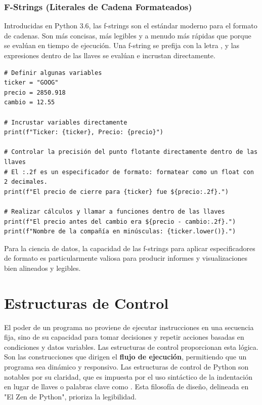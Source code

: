 \subsubsection*{F-Strings (Literales de Cadena Formateados)}
Introducidas en Python 3.6, las f-strings son el estándar moderno para el formato de cadenas. Son más concisas, más legibles y a menudo más rápidas que  porque se evalúan en tiempo de ejecución. Una f-string se prefija con la letra , y las expresiones dentro de las llaves \code{\{\}} se evalúan e incrustan directamente.

\begin{example}
\text{ }\begin{verbatim}
# Definir algunas variables
ticker = "GOOG"
precio = 2850.918
cambio = 12.55

# Incrustar variables directamente
print(f"Ticker: {ticker}, Precio: {precio}")

# Controlar la precisión del punto flotante directamente dentro de las llaves
# El :.2f es un especificador de formato: formatear como un float con 2 decimales.
print(f"El precio de cierre para {ticker} fue ${precio:.2f}.")

# Realizar cálculos y llamar a funciones dentro de las llaves
print(f"El precio antes del cambio era ${precio - cambio:.2f}.")
print(f"Nombre de la compañía en minúsculas: {ticker.lower()}.")
\end{verbatim}
\end{example}
Para la ciencia de datos, la capacidad de las f-strings para aplicar especificadores de formato es particularmente valiosa para producir informes y visualizaciones bien alineados y legibles.

\section{Estructuras de Control}
\label{sec:control_structures}
El poder de un programa no proviene de ejecutar instrucciones en una secuencia fija, sino de su capacidad para tomar decisiones y repetir acciones basadas en condiciones y datos variables. Las estructuras de control proporcionan esta lógica. Son las construcciones que dirigen el \textbf{flujo de ejecución}, permitiendo que un programa sea dinámico y responsivo. Las estructuras de control de Python son notables por su claridad, que es impuesta por el uso sintáctico de la indentación en lugar de llaves o palabras clave como . Esta filosofía de diseño, delineada en "El Zen de Python", prioriza la legibilidad.

